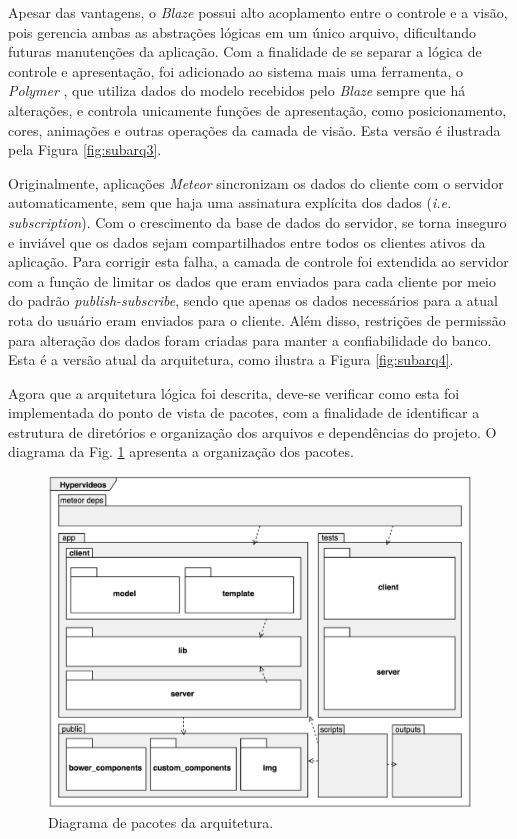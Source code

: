 Apesar das vantagens, o \textit{Blaze} possui alto acoplamento entre o controle e a visão, pois gerencia ambas as abstrações lógicas em um único arquivo, dificultando futuras manutenções da aplicação. Com a finalidade de se separar a lógica de controle e apresentação, foi adicionado ao sistema mais uma ferramenta, o \textit{Polymer} \cite{polymer2015}, que utiliza dados do modelo recebidos pelo \textit{Blaze} sempre que há alterações, e controla unicamente funções de apresentação, como posicionamento, cores, animações e outras operações da camada de visão. Esta versão é ilustrada pela Figura \ref{fig:subarq3}.

Originalmente, aplicações \textit{Meteor} sincronizam os dados do cliente com o servidor automaticamente, sem que haja uma assinatura explícita dos dados (\textit{i.e. subscription}). Com o crescimento da base de dados do servidor, se torna inseguro e inviável que os dados sejam compartilhados entre todos os clientes ativos da aplicação. Para corrigir esta falha, a camada de controle foi extendida ao servidor com a função de limitar os dados que eram enviados para cada cliente por meio do padrão \textit{publish-subscribe}, sendo que apenas os dados necessários para a atual rota do usuário eram enviados para o cliente. Além disso, restrições de permissão para alteração dos dados foram criadas para manter a confiabilidade do banco. Esta é a versão atual da arquitetura, como ilustra a Figura \ref{fig:subarq4}.

Agora que a arquitetura lógica foi descrita, deve-se verificar como esta foi implementada do ponto de vista de pacotes, com a finalidade de identificar a estrutura de diretórios e organização dos arquivos e dependências do projeto. O diagrama da Fig. \ref{fig:arq_pacotes} apresenta a organização dos pacotes.

\begin{figure}[h!]
  	\centering
  	\includegraphics[width=.8\linewidth]{figuras/arq_pacotes.eps}
  	\caption{Diagrama de pacotes da arquitetura.}
  	\label{fig:arq_pacotes}
\end{figure}

